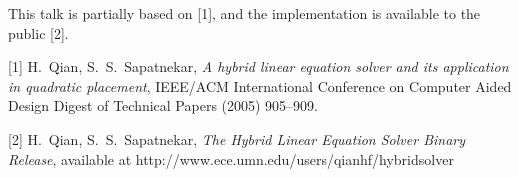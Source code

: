 \documentclass{report}
\begin{document}
This talk is partially based on [1], and the
implementation is available to the public [2].

[1]
H.~Qian, S.~S.~Sapatnekar, {\em A hybrid linear equation
solver and its application in quadratic placement},
IEEE/ACM International Conference on Computer Aided
Design Digest of Technical Papers (2005) 905--909.

[2] H.~Qian, S.~S.~Sapatnekar,
{\em The Hybrid Linear Equation Solver Binary Release},
available at http://www.ece.umn.edu/users/qianhf/hybridsolver



\end{document}
